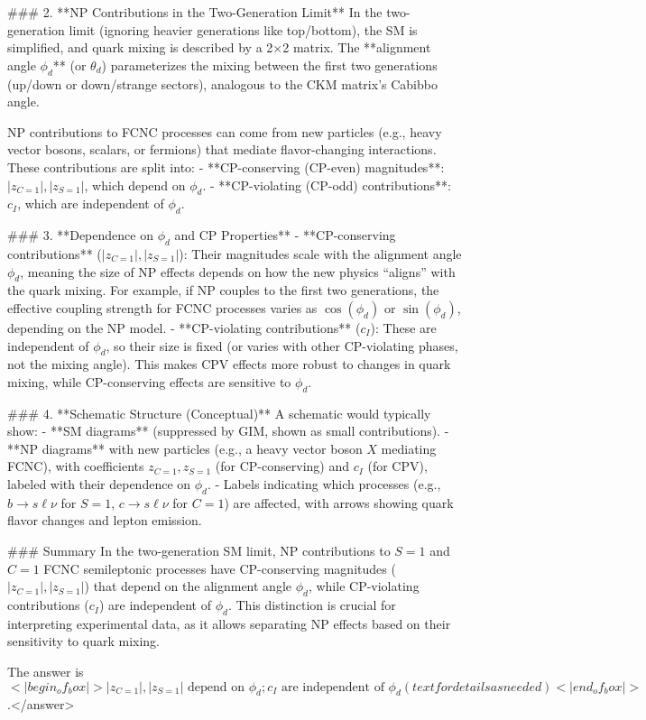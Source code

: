 ### 2. **NP Contributions in the Two-Generation Limit**  
In the two-generation limit (ignoring heavier generations like top/bottom), the SM is simplified, and quark mixing is described by a 2×2 matrix. The **alignment angle \( \phi_d \)** (or \( \theta_d \)) parameterizes the mixing between the first two generations (up/down or down/strange sectors), analogous to the CKM matrix’s Cabibbo angle.  

NP contributions to FCNC processes can come from new particles (e.g., heavy vector bosons, scalars, or fermions) that mediate flavor-changing interactions. These contributions are split into:  
- **CP-conserving (CP-even) magnitudes**: \( |z_{C=1}|, |z_{S=1}| \), which depend on \( \phi_d \).  
- **CP-violating (CP-odd) contributions**: \( c_I \), which are independent of \( \phi_d \).  


### 3. **Dependence on \( \phi_d \) and CP Properties**  
- **CP-conserving contributions** (\( |z_{C=1}|, |z_{S=1}| \)): Their magnitudes scale with the alignment angle \( \phi_d \), meaning the size of NP effects depends on how the new physics “aligns” with the quark mixing. For example, if NP couples to the first two generations, the effective coupling strength for FCNC processes varies as \( \cos(\phi_d) \) or \( \sin(\phi_d) \), depending on the NP model.  
- **CP-violating contributions** (\( c_I \)): These are independent of \( \phi_d \), so their size is fixed (or varies with other CP-violating phases, not the mixing angle). This makes CPV effects more robust to changes in quark mixing, while CP-conserving effects are sensitive to \( \phi_d \).  


### 4. **Schematic Structure (Conceptual)**  
A schematic would typically show:  
- **SM diagrams** (suppressed by GIM, shown as small contributions).  
- **NP diagrams** with new particles (e.g., a heavy vector boson \( X \) mediating FCNC), with coefficients \( z_{C=1}, z_{S=1} \) (for CP-conserving) and \( c_I \) (for CPV), labeled with their dependence on \( \phi_d \).  
- Labels indicating which processes (e.g., \( b \to s\ell\nu \) for \( S=1 \), \( c \to s\ell\nu \) for \( C=1 \)) are affected, with arrows showing quark flavor changes and lepton emission.  


### Summary  
In the two-generation SM limit, NP contributions to \( S=1 \) and \( C=1 \) FCNC semileptonic processes have CP-conserving magnitudes (\( |z_{C=1}|, |z_{S=1}| \)) that depend on the alignment angle \( \phi_d \), while CP-violating contributions (\( c_I \)) are independent of \( \phi_d \). This distinction is crucial for interpreting experimental data, as it allows separating NP effects based on their sensitivity to quark mixing.  

The answer is \(<|begin_of_box|>|z_{C=1}|, |z_{S=1}| \text{ depend on } \phi_d; c_I \text{ are independent of } \phi_d (text for details as needed)<|end_of_box|>\).</answer>